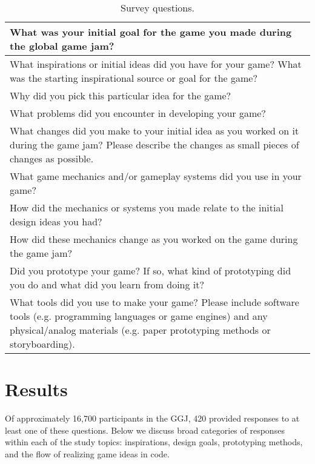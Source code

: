 \documentclass{sig-alternate}
\begin{document}
\begin{table}
\begin{tabular}{|p{\linewidth}|}
\hline What was your initial goal for the game you made during the global game jam? \\
\hline What inspirations or initial ideas did you have for your game? What was the starting inspirational source or goal for the game? \\
\hline Why did you pick this particular idea for the game? \\
\hline What problems did you encounter in developing your game? \\
\hline What changes did you make to your initial idea as you worked on it during the game jam? Please describe the changes as small pieces of changes as possible. \\
\hline What game mechanics and/or gameplay systems did you use in your game? \\
\hline How did the mechanics or systems you made relate to the initial design ideas you had? \\
\hline How did these mechanics change as you worked on the game during the game jam? \\
\hline Did you prototype your game? If so, what kind of prototyping did you do and what did you learn from doing it? \\
\hline What tools did you use to make your game? Please include software tools (e.g. programming languages or game engines) and any physical/analog materials (e.g. paper prototyping methods or storyboarding). \\
\hline 
\end{tabular}
\caption{Survey questions.}
\label{tab:survey} 
\end{table}


\section{Results}
Of approximately 16,700 participants in the GGJ, 420 provided responses to at least one of these questions.
Below we discuss broad categories of responses within each of the study topics: inspirations, design goals, prototyping methods, and the flow of realizing game ideas in code.

\end{document}
